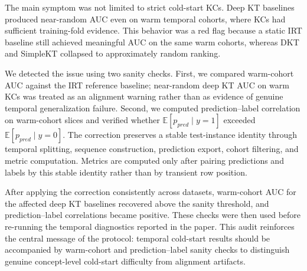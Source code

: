 The main symptom was not limited to strict cold-start KCs. Deep KT baselines produced near-random AUC even on warm temporal cohorts, where KCs had sufficient training-fold evidence. This behavior was a red flag because a static IRT baseline still achieved meaningful AUC on the same warm cohorts, whereas DKT and SimpleKT collapsed to approximately random ranking.

We detected the issue using two sanity checks. First, we compared warm-cohort AUC against the IRT reference baseline; near-random deep KT AUC on warm KCs was treated as an alignment warning rather than as evidence of genuine temporal generalization failure. Second, we computed prediction--label correlation on warm-cohort slices and verified whether $\mathbb{E}[p_{pred}\mid y=1]$ exceeded $\mathbb{E}[p_{pred}\mid y=0]$. The correction preserves a stable test-instance identity through temporal splitting, sequence construction, prediction export, cohort filtering, and metric computation. Metrics are computed only after pairing predictions and labels by this stable identity rather than by transient row position.

After applying the correction consistently across datasets, warm-cohort AUC for the affected deep KT baselines recovered above the sanity threshold, and prediction--label correlations became positive. These checks were then used before re-running the temporal diagnostics reported in the paper. This audit reinforces the central message of the protocol: temporal cold-start results should be accompanied by warm-cohort and prediction--label sanity checks to distinguish genuine concept-level cold-start difficulty from alignment artifacts.
